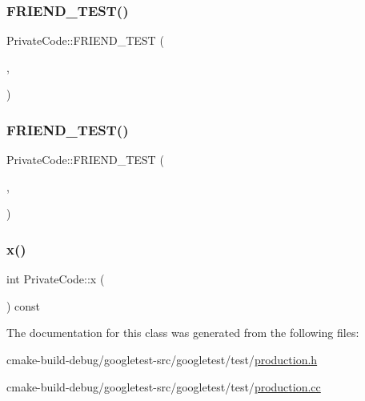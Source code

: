 \subsubsection{\texorpdfstring{FRIEND\_TEST()}{FRIEND\_TEST()}\hspace{0.1cm}{\footnotesize\ttfamily [1/2]}}
{\footnotesize\ttfamily Private\+Code\+::\+F\+R\+I\+E\+N\+D\+\_\+\+T\+E\+ST (\begin{DoxyParamCaption}\item[{Private\+Code\+Test}]{,  }\item[{Can\+Access\+Private\+Members}]{ }\end{DoxyParamCaption})}

\mbox{\label{classPrivateCode_a29b6823300f68d78691476eeeaed8a7c}} 
\subsubsection{\texorpdfstring{FRIEND\_TEST()}{FRIEND\_TEST()}\hspace{0.1cm}{\footnotesize\ttfamily [2/2]}}
{\footnotesize\ttfamily Private\+Code\+::\+F\+R\+I\+E\+N\+D\+\_\+\+T\+E\+ST (\begin{DoxyParamCaption}\item[{\mbox{\hyperlink{gtest__prod__test_8cc_a89debba10c803e339ce0f9b0b34a2267}{Private\+Code\+Fixture\+Test}}}]{,  }\item[{Can\+Access\+Private\+Members}]{ }\end{DoxyParamCaption})}

\mbox{\label{classPrivateCode_a247781246ce4d0c66563eaa39ba5aaa9}} 
\subsubsection{\texorpdfstring{x()}{x()}}
{\footnotesize\ttfamily int Private\+Code\+::x (\begin{DoxyParamCaption}{ }\end{DoxyParamCaption}) const\hspace{0.3cm}{\ttfamily [inline]}}



The documentation for this class was generated from the following files\+:\begin{DoxyCompactItemize}
\item 
cmake-\/build-\/debug/googletest-\/src/googletest/test/\mbox{\hyperlink{production_8h}{production.\+h}}\item 
cmake-\/build-\/debug/googletest-\/src/googletest/test/\mbox{\hyperlink{production_8cc}{production.\+cc}}\end{DoxyCompactItemize}

